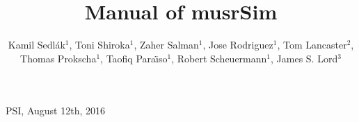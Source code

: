 \documentclass[twoside]{dis04}
\begin{document}
\newcommand{\musr}{\ensuremath{\mu}SR}

\title{Manual of musrSim}

\author{Kamil Sedl\'ak$^1$, Toni Shiroka$^1$, Zaher Salman$^1$, Jose Rodriguez$^1$, Tom Lancaster$^2$, Thomas Prokscha$^1$, Taofiq Para\"{\i}so$^1$, Robert Scheuermann$^1$, James S. Lord$^3$}

\address{{$^1$ Laboratory for Muon Spin Spectroscopy, Paul Scherrer Institut, CH-5232 Villigen PSI, Switzerland}\\
$^2$ Clarendon Laboratory, Department of Physics, Oxford University, Parks Road, Oxford OX1 3PU, UK\\
$^3$ ISIS Facility, Rutherford Appleton Laboratory, Chilton, Oxon OX11 0QX, U.K.}

\maketitle
\footnotesize
\begin{center}
  PSI, August 12th, 2016
\end{center}\vspace{2mm}
\normalsize
{}

\end{document}
